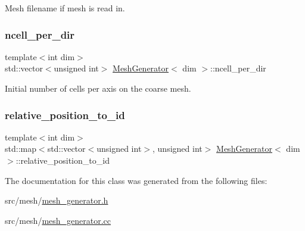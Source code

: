 Mesh filename if mesh is read in. 

\mbox{\label{class_mesh_generator_a4d73b2d6a3f66e8a696e2228dc53fb76}} 
\subsubsection{\texorpdfstring{ncell\+\_\+per\+\_\+dir}{ncell\_per\_dir}}
{\footnotesize\ttfamily template$<$int dim$>$ \\
std\+::vector$<$unsigned int$>$ \hyperlink{class_mesh_generator}{Mesh\+Generator}$<$ dim $>$\+::ncell\+\_\+per\+\_\+dir\hspace{0.3cm}{\ttfamily [private]}}



Initial number of cells per axis on the coarse mesh. 

\mbox{\label{class_mesh_generator_a4d3e0a3f830a2fa4d35d7f269fba3b02}} 
\subsubsection{\texorpdfstring{relative\+\_\+position\+\_\+to\+\_\+id}{relative\_position\_to\_id}}
{\footnotesize\ttfamily template$<$int dim$>$ \\
std\+::map$<$std\+::vector$<$unsigned int$>$, unsigned int$>$ \hyperlink{class_mesh_generator}{Mesh\+Generator}$<$ dim $>$\+::relative\+\_\+position\+\_\+to\+\_\+id\hspace{0.3cm}{\ttfamily [private]}}



The documentation for this class was generated from the following files\+:\begin{DoxyCompactItemize}
\item 
src/mesh/\hyperlink{mesh__generator_8h}{mesh\+\_\+generator.\+h}\item 
src/mesh/\hyperlink{mesh__generator_8cc}{mesh\+\_\+generator.\+cc}\end{DoxyCompactItemize}
